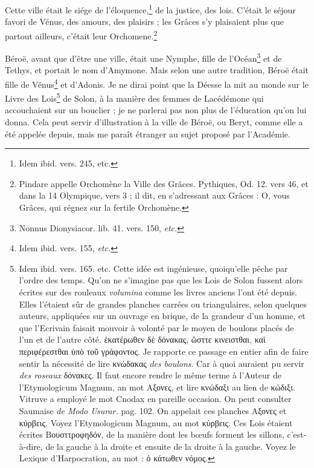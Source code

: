 \documentclass[a4paper, 11pt, oneside, polutonikogreek, french]{article}
\begin{document}
Cette ville était le siége de l'éloquence,\footnote{Idem ibid. vers. 245, etc.} de la justice, des lois. C'était le séjour favori de Vénus, des amours, des plaisirs ; les Grâces s'y plaisaient plus que partout ailleurs, c'était leur Orchomene.\footnote{Pindare appelle Orchomène la Ville des Grâces. Pythiques, Od. 12. vers 46, et dans la 14 Olympique, vers 3 ; il dit, en s'adressant aux Grâces : O, vous Grâces, qui régnez sur la fertile Orchomène.}

Béroë, avant que d'être une ville, était une Nymphe, fille de l'Océan\footnote{Nonnus Dionysiacor. lib. 41. vers. 150, \emph{etc.}} et de Tethys, et portait le nom d'Amymone. Mais selon une autre tradition, Béroë était fille de Vénus\footnote{Idem ibid. vers. 155, \emph{etc.}} et d'Adonis. Je ne dirai point que la Déesse la mit au monde sur le Livre des Lois\footnote{Idem ibid. vers. 165. etc. Cette idée est ingénieuse, quoiqu'elle pêche par l'ordre des temps. Qu'on ne s'imagine pas que les Lois de Solon fussent alors écrites sur des rouleaux \emph{volumina} comme les livres anciens l'ont été depuis. Elles l'étaient sûr de grandes planches carrées ou triangulaires, selon quelques auteurs, appliquées sur un ouvrage en brique, de la grandeur d'un homme, et que l'Ecrivain faisait mouvoir à volonté par le moyen de boulons placés de l'un et de l'autre côté. ἑκατέρωθεν δὲ δόνακας, ὥσττε κινειστθαι, καὶ περιφέρεστθαι ὑπὸ τοῦ γράφοντος. Je rapporte ce passage en entier afin de faire sentir la nécessité de lire κνώδακας \emph{des boulons}. Car à quoi auraient pu servir \emph{des roseaux} δόνακες. Il faut encore rendre le même terme à l'Auteur de l'Etymologicum Magnum, an mot Αξονες, et lire κνώδαξι au lien de κώδιξι. Vitruve a employé le mot Cnodax en pareille occasion. On peut consulter Saumaise \emph{de Modo Usurar.} pag. 102. On appelait ces planches Αξονες et κύρβεις. Voyez l'Etymologicum Magnum, au mot κύρβεις. Ces Lois étaient écrites Βουσττροφηδόν, de la manière dont les bœufs forment les sillons, c'est-à-dire, de la gauche à la droite et ensuite de la droite à la gauche. Voyez le Lexique d'Harpocration, au mot : ὀ κάτωθεν νόμος.} de Solon, à la manière des femmes de Lacédémone qui accouchaient sur un bouclier ; je ne parlerai pas non plus de l'éducation qu'on lui donna. Cela peut servir d'illustration à la ville de Béroë, ou Beryt, comme elle a été appelée depuis, mais me paraît étranger au sujet proposé par l'Académie.
\end{document}
